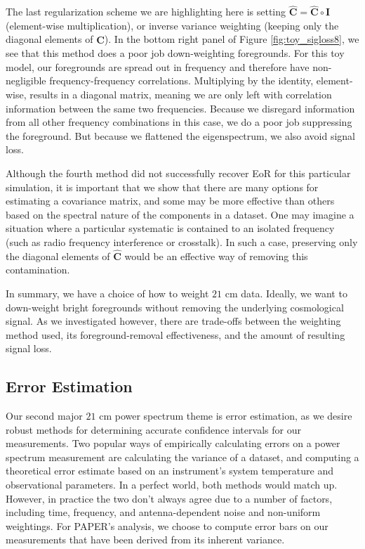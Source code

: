 \documentclass[preprint2,numberedappendix,tighten]{aastex6}  %
\begin{document}
The last regularization scheme we are highlighting here is setting $\hat{\textbf{C}} = \hat{\textbf{C}} \circ \textbf{I}$ (element-wise multiplication), or inverse variance weighting (keeping only the diagonal elements of $\hat{\textbf{C}}$). In the bottom right panel of Figure \ref{fig:toy_sigloss8}, we see that this method does a poor job down-weighting foregrounds. For this toy model, our foregrounds are spread out in frequency and therefore have non-negligible frequency-frequency correlations. Multiplying by the identity, element-wise, results in a diagonal matrix, meaning we are only left with correlation information between the same two frequencies. Because we disregard information from all other frequency combinations in this case, we do a poor job suppressing the foreground. But because we flattened the eigenspectrum, we also avoid signal loss. 

Although the fourth method did not successfully recover EoR for this particular simulation, it is important that we show that there are many options for estimating a covariance matrix, and some may be more effective than others based on the spectral nature of the components in a dataset. One may imagine a situation where a particular systematic is contained to an isolated frequency (such as radio frequency interference or crosstalk). In such a case, preserving only the diagonal elements of $\hat{\textbf{C}}$ would be an effective way of removing this contamination. 

In summary, we have a choice of how to weight $21$ cm data. Ideally, we want to down-weight bright foregrounds without removing the underlying cosmological signal. As we investigated however, there are trade-offs between the weighting method used, its foreground-removal effectiveness, and the amount of resulting signal loss. 


\subsection{Error Estimation}
\label{sec:ErrorOverview}

Our second major $21$ cm power spectrum theme is error estimation, as we desire robust methods for determining accurate confidence intervals for our measurements. Two popular ways of empirically calculating errors on a power spectrum measurement are calculating the variance of a dataset, and computing a theoretical error estimate based on an instrument's system temperature and observational parameters. In a perfect world, both methods would match up. However, in practice the two don't always agree due to a number of factors, including time, frequency, and antenna-dependent noise and non-uniform weightings. For PAPER's analysis, we choose to compute error bars on our measurements that have been derived from its inherent variance.
\end{document}
